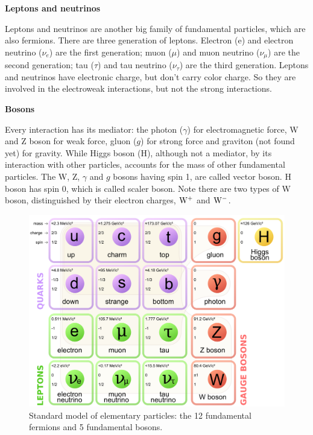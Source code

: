 {\bf Leptons and neutrinos}

Leptons and neutrinos are another big family of fundamental particles, which are also fermions. 
There are three generation of leptons. Electron (e) and electron neutrino ($\nu_e$) are the first generation; 
muon ($\mu$) and muon neutrino ($\nu_\mu$) are the second generation; 
tau ($\tau$) and tau neutrino ($\nu_\tau$) are the third generation.  Leptons and neutrinos 
have electronic charge,  but don't 
carry color charge. So they are involved in the electroweak interactions, but not the
strong interactions. 

{\bf Bosons}

Every interaction has its mediator: the photon ($\gamma$) for electromagnetic force,  W and Z boson for weak force, gluon ($g$) for strong force and 
graviton (not found yet) for gravity.  While Higgs boson (H), although not a mediator,  by its interaction with other particles, 
accounts for the mass of other fundamental particles. 
The W, Z, $\gamma$ and $g$ bosons having spin 1, are called vector boson. H boson has spin 0, which is called scaler boson. 
Note there are two types of W boson, distinguished by their electron charges,  ${\rm W^+}$ and ${\rm W^-}$. 


\begin{figure}[htb]
\centering
\includegraphics[width=.7\textwidth]{figures/Standard_Model_particles.png}
\caption{Standard model of elementary particles: 
the 12 fundamental fermions and 5 fundamental bosons.~\cite{particleImage}}
\label{figs:SMParticles}
\end{figure}  


